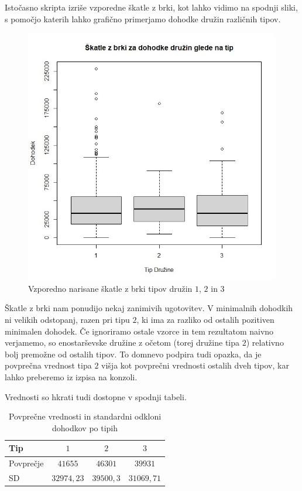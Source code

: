 \documentclass[a4paper, 10pt]{article}
\begin{document}
	Istočasno skripta izriše vzporedne škatle z brki, kot lahko vidimo na spodnji sliki, s pomočjo katerih lahko grafično primerjamo dohodke družin različnih tipov.
	
	\begin{figure}[h!]
		\label{fig: boxplotA}
		\centering
		\includegraphics[scale = 0.35]{TabelaSample1}
		\caption{Vzporedno narisane škatle z brki tipov družin $1$, $2$ in $3$}
	\end{figure}
	Škatle z brki nam ponudijo nekaj zanimivih ugotovitev. V minimalnih dohodkih ni velikih odstopanj, razen pri tipu $2$, ki ima za razliko od ostalih pozitiven minimalen dohodek. Če ignoriramo ostale vzorce in tem rezultatom naivno verjamemo, so enostarševske družine z očetom (torej družine tipa $2$) relativno bolj premožne od ostalih tipov. To domnevo podpira tudi opazka, da je povprečna vrednost tipa $2$ višja kot povprečni vrednosti ostalih dveh tipov, kar lahko preberemo iz izpisa na konzoli. 

	Vrednosti so hkrati tudi dostopne v spodnji tabeli. 

	\begin{table}[h!]
		\label{tab: MeanSDA}
		\centering
		\begin{tabular}{|l|c|c|c|}
			\hline
			Tip & $1$ & $2$ & $3$ \\ \hline
			Povprečje & $41655$ & $46301$ & $39931$ \\ \hline
			SD & $32974{,}23$ & $39500{,}3$ & $31069{,}71$ \\ \hline
		\end{tabular}
	\caption{Povprečne vrednosti in standardni odkloni dohodkov po tipih}
	\end{table}
\end{document}
